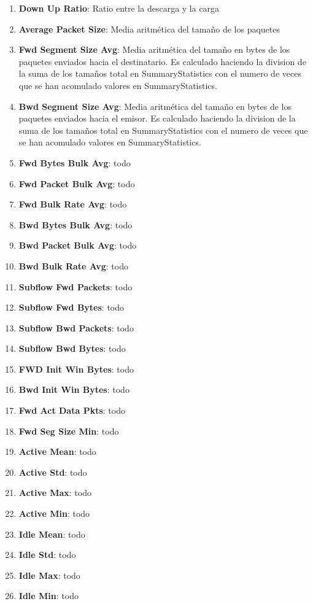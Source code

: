 \begin{enumerate}
    \item \textbf{Down Up Ratio}: Ratio entre la descarga y la carga
    \item \textbf{Average Packet Size}: Media aritmética del tamaño de los paquetes
    \item \textbf{Fwd Segment Size Avg}: Media aritmética del tamaño en bytes de los paquetes enviados hacia el destinatario. Es calculado haciendo la division de la suma de los tamaños total en SummaryStatistics con el numero de veces que se han acomulado valores en SummaryStatistics.
    \item \textbf{Bwd Segment Size Avg}: Media aritmética del tamaño en bytes de los paquetes enviados hacia el emisor. Es calculado haciendo la division de la suma de los tamaños total en SummaryStatistics con el numero de veces que se han acomulado valores en SummaryStatistics.
    \item \textbf{Fwd Bytes Bulk Avg}: todo
    \item \textbf{Fwd Packet Bulk Avg}: todo
    \item \textbf{Fwd Bulk Rate Avg}: todo
    \item \textbf{Bwd Bytes Bulk Avg}: todo
    \item \textbf{Bwd Packet Bulk Avg}: todo
    \item \textbf{Bwd Bulk Rate Avg}: todo
    \item \textbf{Subflow Fwd Packets}: todo
    \item \textbf{Subflow Fwd Bytes}: todo
    \item \textbf{Subflow Bwd Packets}: todo
    \item \textbf{Subflow Bwd Bytes}: todo
    \item \textbf{FWD Init Win Bytes}: todo
    \item \textbf{Bwd Init Win Bytes}: todo
    \item \textbf{Fwd Act Data Pkts}: todo
    \item \textbf{Fwd Seg Size Min}: todo
    \item \textbf{Active Mean}: todo
    \item \textbf{Active Std}: todo
    \item \textbf{Active Max}: todo
    \item \textbf{Active Min}: todo
    \item \textbf{Idle Mean}: todo
    \item \textbf{Idle Std}: todo
    \item \textbf{Idle Max}: todo
    \item \textbf{Idle Min}: todo
\end{enumerate}

